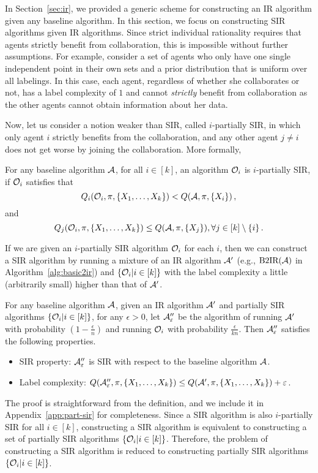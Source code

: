 In Section~\ref{sec:ir},
we provided a generic scheme for constructing an IR algorithm given any baseline algorithm.
In this section, we focus on constructing SIR algorithms given IR algorithms.
Since strict individual rationality requires that agents strictly benefit from collaboration, this is impossible without further assumptions. 
% 
For example, consider a set of agents who only have one single independent point in their own sets 
and a prior distribution that is uniform over all labelings. 
In this case, each agent, regardless of whether she collaborates or not, has a label complexity of $1$ and cannot \emph{strictly} benefit from collaboration as the other agents cannot obtain information about her data.

Now, let us consider a notion weaker than SIR, called $i$-partially SIR, in which only agent $i$ strictly benefits from the collaboration, and any other agent $j\neq i$ does not get worse by joining the collaboration.
More formally, 
\begin{definition}
    For any baseline algorithm $\mathcal{A}$, for all $i\in [k]$, an algorithm $\mathcal{O}_i$ is $i$-partially SIR, if $\mathcal{O}_i$ satisfies that
    \[Q_i(\mathcal{O}_i, \pi, \{X_1,\ldots,X_k\}) < Q(\mathcal{A},\pi, \{X_i\})\,,\]
    and 
    \[Q_{j}(\mathcal{O}_i,\pi,\{X_1,\ldots,X_k\})\leq Q(\mathcal{A},\pi,\{X_j\}), \forall j\in [k]\setminus \{i\}\,.\]
\end{definition}
If we are given an $i$-partially SIR algorithm $\mathcal{O}_i$ for each $i$, then we can construct a SIR algorithm by running a mixture of an IR algorithm $\mathcal{A}'$ (e.g., $\textrm{B2IR}(\mathcal{A})$ in Algorithm~\ref{alg:basic2ir}) and $\{\mathcal{O}_i|i\in [k]\}$ with the label complexity a little (arbitrarily small) higher than that of $\mathcal{A}'$.
\begin{lemma}\label{lmm:partsir}
    For any baseline algorithm $\mathcal{A}$, given an IR algorithm $\mathcal{A}'$ and partially SIR algorithms $\{\mathcal{O}_i|i\in [k]\}$, for any $\epsilon>0$, let $\mathcal{A}''_\varepsilon$ be the algorithm of running $\mathcal{A}'$ with probability $(1-\frac{\epsilon}{n})$ and running $\mathcal{O}_i$ with probability $\frac{\epsilon}{kn}$.
    Then $\mathcal{A}''_\varepsilon$ satisfies the following properties.
    \begin{itemize}[topsep=0pt,itemsep =-0.5ex,  leftmargin = 6mm]
        \item SIR property: $\mathcal{A}''_\varepsilon$ is SIR with respect to the baseline algorithm $\mathcal{A}$.
        \item Label complexity: $Q(\mathcal{A}''_\varepsilon, \pi, \{X_1,\ldots,X_k\})\leq Q(\mathcal{A}', \pi, \{X_1,\ldots,X_k\}) +\varepsilon$.
    \end{itemize}
\end{lemma}
The proof is straightforward from the definition, and we include it in Appendix~\ref{app:part-sir} for completeness.
Since a SIR algorithm is also $i$-partially SIR for all $i\in [k]$, constructing a SIR algorithm is equivalent to constructing a set of partially SIR algorithms $\{\mathcal{O}_i|i\in [k]\}$.
Therefore, the problem of constructing a SIR algorithm is reduced to constructing partially SIR algorithms $\{\mathcal{O}_i|i\in [k]\}$. 

